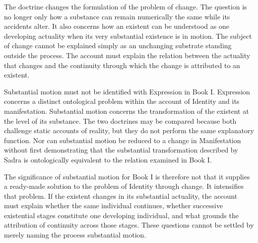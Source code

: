 \label{para:VS.B01.P01.C08.S17.SS09.P003}

The doctrine changes the formulation
of the problem of change.
The question is no longer
only how a substance can
remain numerically the same
while its accidents alter.
It also concerns how an
existent can be understood
as one developing actuality
when its very substantial
existence is in motion.
The subject of change cannot
be explained simply as an
unchanging substrate standing
outside the process. The
account must explain the
relation between the actuality
that changes and the continuity
through which the change
is attributed to an existent.

\label{para:VS.B01.P01.C08.SS09.P004}

Substantial motion must not
be identified with Expression
in Book I. Expression concerns
a distinct ontological problem
within the account of Identity
and its manifestation. Substantial
motion concerns the transformation
of the existent at the level
of its substance. The two
doctrines may be compared
because both challenge static
accounts of reality, but
they do not perform the
same explanatory function.
Nor can substantial motion
be reduced to a change in
Manifestation without first
demonstrating that the
substantial transformation
described by Sadra is
ontologically equivalent
to the relation examined
in Book I.

\label{para:VS.B01.P01.C08.S17.SS09.P005}

The significance of substantial
motion for Book I is therefore
not that it supplies a ready-made
solution to the problem of
Identity through change.
It intensifies that problem.
If the existent changes
in its substantial actuality,
the account must explain
whether the same individual
continues, whether successive
existential stages constitute
one developing individual,
and what grounds the attribution
of continuity across those
stages. These questions cannot
be settled by merely naming
the process substantial motion.




